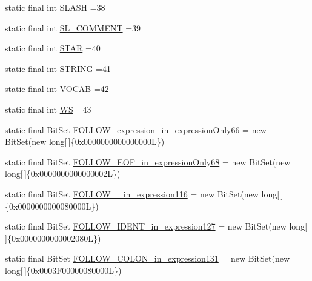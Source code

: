 \begin{DoxyCompactItemize}
\item 
static final int \hyperlink{classorg_1_1tzi_1_1use_1_1parser_1_1ocl_1_1_o_c_l_parser_a72b4c17404e62a6c5d033cc2eaa73572}{S\-L\-A\-S\-H} =38
\item 
static final int \hyperlink{classorg_1_1tzi_1_1use_1_1parser_1_1ocl_1_1_o_c_l_parser_a3cf20a9022d17a0270d06b286e382826}{S\-L\-\_\-\-C\-O\-M\-M\-E\-N\-T} =39
\item 
static final int \hyperlink{classorg_1_1tzi_1_1use_1_1parser_1_1ocl_1_1_o_c_l_parser_a20893d135861bf6dc6adb155658143d1}{S\-T\-A\-R} =40
\item 
static final int \hyperlink{classorg_1_1tzi_1_1use_1_1parser_1_1ocl_1_1_o_c_l_parser_a759266d152d2d7e5490b6c2fe0821774}{S\-T\-R\-I\-N\-G} =41
\item 
static final int \hyperlink{classorg_1_1tzi_1_1use_1_1parser_1_1ocl_1_1_o_c_l_parser_a47d84aa54e574d7c5821623aa70d8074}{V\-O\-C\-A\-B} =42
\item 
static final int \hyperlink{classorg_1_1tzi_1_1use_1_1parser_1_1ocl_1_1_o_c_l_parser_a2ea78b5efa518cce6ffa85f93a232d54}{W\-S} =43
\item 
static final Bit\-Set \hyperlink{classorg_1_1tzi_1_1use_1_1parser_1_1ocl_1_1_o_c_l_parser_a70c0efefc3e73b23b74da582f75783c6}{F\-O\-L\-L\-O\-W\-\_\-expression\-\_\-in\-\_\-expression\-Only66} = new Bit\-Set(new long\mbox{[}$\,$\mbox{]}\{0x0000000000000000\-L\})
\item 
static final Bit\-Set \hyperlink{classorg_1_1tzi_1_1use_1_1parser_1_1ocl_1_1_o_c_l_parser_a5c78f1f382573af19d6633de90e48eb3}{F\-O\-L\-L\-O\-W\-\_\-\-E\-O\-F\-\_\-in\-\_\-expression\-Only68} = new Bit\-Set(new long\mbox{[}$\,$\mbox{]}\{0x0000000000000002\-L\})
\item 
static final Bit\-Set \hyperlink{classorg_1_1tzi_1_1use_1_1parser_1_1ocl_1_1_o_c_l_parser_adc58768cd0aa1b4a1c49e42b721b06f3}{F\-O\-L\-L\-O\-W\-\_\-\_\-in\-\_\-expression116} = new Bit\-Set(new long\mbox{[}$\,$\mbox{]}\{0x0000000000080000\-L\})
\item 
static final Bit\-Set \hyperlink{classorg_1_1tzi_1_1use_1_1parser_1_1ocl_1_1_o_c_l_parser_aa51fecfef67563fa8c14d1947a8f1f43}{F\-O\-L\-L\-O\-W\-\_\-\-I\-D\-E\-N\-T\-\_\-in\-\_\-expression127} = new Bit\-Set(new long\mbox{[}$\,$\mbox{]}\{0x0000000000002080\-L\})
\item 
static final Bit\-Set \hyperlink{classorg_1_1tzi_1_1use_1_1parser_1_1ocl_1_1_o_c_l_parser_a3732c820cf13cfd43eb6be75a925dd14}{F\-O\-L\-L\-O\-W\-\_\-\-C\-O\-L\-O\-N\-\_\-in\-\_\-expression131} = new Bit\-Set(new long\mbox{[}$\,$\mbox{]}\{0x0003\-F00000080000\-L\})

\end{DoxyCompactItemize}
